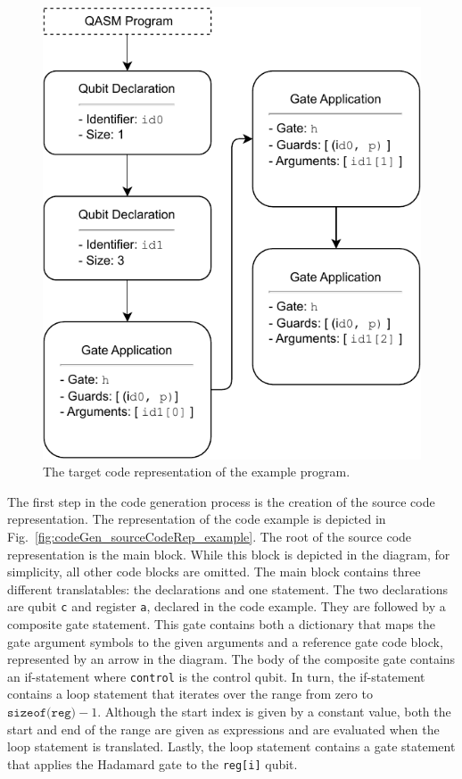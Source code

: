 \begin{figure}
\begin{minipage}{.45\textwidth}
        \includegraphics[width=\textwidth]{../figures/drawio/codeGen_targetCode_example.pdf}
        \caption{The target code representation of the example program.}    
        \label{fig:implementation_targetCodeRep_example}
    \end{minipage}
\end{figure}

The first step in the code generation process is the creation of the source code representation. The representation of the code example is depicted in Fig.~\ref{fig:codeGen_sourceCodeRep_example}. The root of the source code representation is the main block. While this block is depicted in the diagram, for simplicity, all other code blocks are omitted. The main block contains three different translatables: the declarations and one statement. The two declarations are qubit \texttt{c} and register \texttt{a}, declared in the code example. They are followed by a composite gate statement. This gate contains both a dictionary that maps the gate argument symbols to the given arguments and a reference gate code block, represented by an arrow in the diagram. The body of the composite gate contains an if-statement where \texttt{control} is the control qubit. In turn, the if-statement contains a loop statement that iterates over the range from zero to $\texttt{sizeof(reg)} - 1$. Although the start index is given by a constant value, both the start and end of the range are given as expressions and are evaluated when the loop statement is translated. Lastly, the loop statement contains a gate statement that applies the Hadamard gate to the \texttt{reg[i]} qubit.

